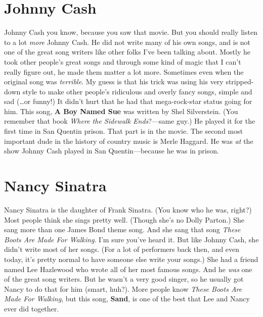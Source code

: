 \documentclass[letterpaper,single]{article}
\begin{document}
\section{Johnny Cash}
Johnny Cash you know, because you saw that movie.
But you should really listen to a lot \emph{more} Johnny Cash. 
He did not write many of his own songs, and is not one of the great song writers like other folks I've been talking about. 
Mostly he took other people's great songs and through some kind of magic that I can't really figure out, he made them matter a lot more.
Sometimes even when the original song was \emph{terrible}. 
My guess is that his trick was using his very stripped-down style to make other people's ridiculous and overly fancy songs, simple and sad (\ldots or funny!)
It didn't hurt that he had that mega-rock-star status going for him.
This song, \textbf{A Boy Named Sue} was written by Shel Silverstein. 
(You remember that book \emph{Where the Sidewalk Ends}?---same guy.) 
He played it for the first time in San Quentin prison. 
That part is in the movie.
The second most important dude in the history of country music is Merle Haggard. He was \emph{at} the show Johnny Cash played in San Quentin---because he was in prison.

\section{Nancy Sinatra}
Nancy Sinatra is the daughter of Frank Sinatra. (You know who he was, right?) 
Most people think she sings pretty well. (Though she's no Dolly Parton.)
She sang more than one James Bond theme song. 
And she sang that song \emph{These Boots Are Made For Walking}. 
I'm sure you've heard it. 
But like Johnny Cash, she didn't write most of her songs. 
(For a lot of performers back then, and even today, it's pretty normal to have someone else write your songs.)
She had a friend named Lee Hazlewood who wrote all of her most famous songs. 
And he \emph{was} one of the great song writers. 
But he wasn't a very good singer, so he usually got Nancy to do that for him (smart, huh?). 
More people know \emph{These Boots Are Made For Walking}, but this song, \textbf{Sand}, is one of the best that Lee and Nancy ever did together.
\end{document}
